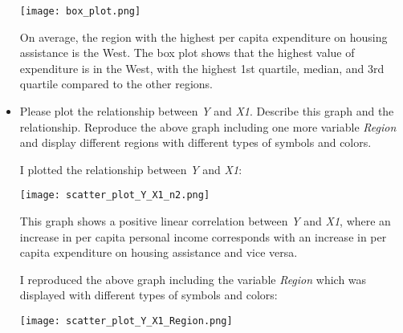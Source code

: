 \documentclass[12pt,letterpaper]{article}
\begin{document}
\begin{itemize}
		\texttt{[image: box\_plot.png]}
		
		On average, the region with the highest per capita expenditure on housing assistance is the West. The box plot shows that the highest value of expenditure is in the West, with the highest 1st quartile, median, and 3rd quartile compared to the other regions.
		
		\newpage
		\item Please plot the relationship between \emph{Y} and \emph{X1}. Describe this graph and the relationship. Reproduce the above graph including one more variable \emph{Region} and display different regions with different types of symbols and colors.
		
		I plotted the relationship between \emph{Y} and \emph{X1}:
		
		
		\texttt{[image: scatter\_plot\_Y\_X1\_n2.png]}
				
		This graph shows a positive linear correlation between \emph{Y} and \emph{X1}, where an increase in per capita personal income corresponds with an increase in per capita expenditure on housing assistance and vice versa.
		
		\newpage
		
		I reproduced the above graph including the variable \emph{Region} which was displayed with different types of symbols and colors:
		
		
		\texttt{[image: scatter\_plot\_Y\_X1\_Region.png]}
		
	\end{itemize}
	
\end{document}
